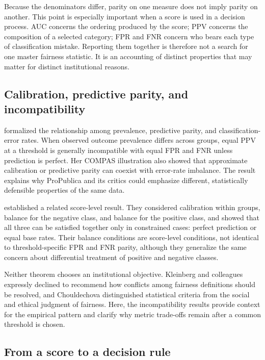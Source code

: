 \documentclass[11pt,letterpaper]{article}
\begin{document}
Because the denominators differ, parity on one measure does not imply parity on another. This point is especially important when a score is used in a decision process. AUC concerns the ordering produced by the score; PPV concerns the composition of a selected category; FPR and FNR concern who bears each type of classification mistake. Reporting them together is therefore not a search for one master fairness statistic. It is an accounting of distinct properties that may matter for distinct institutional reasons.

\subsection{Calibration, predictive parity, and incompatibility}

\citet{chouldechova2017} formalized the relationship among prevalence, predictive parity, and classification-error rates. When observed outcome prevalence differs across groups, equal PPV at a threshold is generally incompatible with equal FPR and FNR unless prediction is perfect. Her COMPAS illustration also showed that approximate calibration or predictive parity can coexist with error-rate imbalance. The result explains why ProPublica and its critics could emphasize different, statistically defensible properties of the same data.

\citet{kleinberg2017} established a related score-level result. They considered calibration within groups, balance for the negative class, and balance for the positive class, and showed that all three can be satisfied together only in constrained cases: perfect prediction or equal base rates. Their balance conditions are score-level conditions, not identical to threshold-specific FPR and FNR parity, although they generalize the same concern about differential treatment of positive and negative classes.

Neither theorem chooses an institutional objective. Kleinberg and colleagues expressly declined to recommend how conflicts among fairness definitions should be resolved, and Chouldechova distinguished statistical criteria from the social and ethical judgment of fairness. Here, the incompatibility results provide context for the empirical pattern and clarify why metric trade-offs remain after a common threshold is chosen.

\subsection{From a score to a decision rule}
\end{document}
